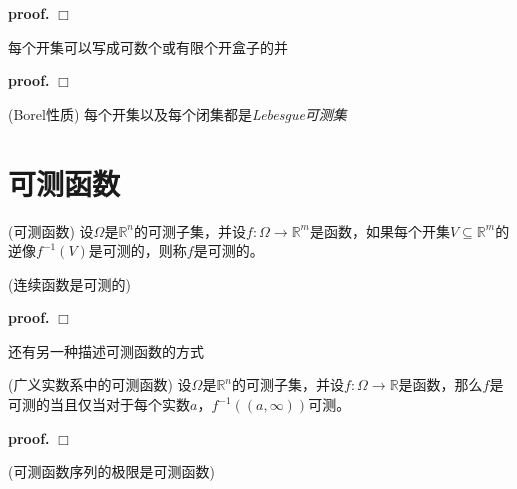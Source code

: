 \textbf{proof.} $\Box$

\begin{mdframed}
    \begin{lemma}
        每个开集可以写成可数个或有限个开盒子的并
    \end{lemma}
\end{mdframed}

\textbf{proof.} $\Box$

\begin{mdframed}
    \begin{lemma}
        (Borel性质) 每个开集以及每个闭集都是\textsl{Lebesgue可测集}
    \end{lemma}
\end{mdframed}

\section{可测函数}

\begin{mdframed}
    \begin{define}
        (可测函数) 设$\Omega$是$\mathbb{R}^n$的可测子集，并设$f:\Omega\rightarrow \mathbb{R}^m$是函数，如果每个开集$V\subseteq \mathbb{R}^m$的逆像$f^{-1}(V)$是可测的，则称$f$是可测的。
    \end{define}
\end{mdframed}

\begin{mdframed}
    \begin{lemma}
        (连续函数是可测的)
    \end{lemma}
\end{mdframed}

\textbf{proof.} $\Box$

还有另一种描述可测函数的方式
\begin{mdframed}
    \begin{lemma}
        (广义实数系中的可测函数) 设$\Omega$是$\mathbb{R}^n$的可测子集，并设$f:\Omega\rightarrow \mathbb{R}$是函数，那么$f$是可测的当且仅当对于每个实数$a$，$f^{-1}((a,\infty))$可测。
    \end{lemma}
\end{mdframed}

\textbf{proof.} $\Box$

\begin{mdframed}
    \begin{lemma}
        (可测函数序列的极限是可测函数)
    \end{lemma}
\end{mdframed}
